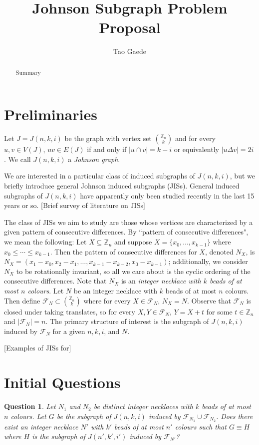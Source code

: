 \documentclass[12]{article}
\title{ \vspace{-3cm} Johnson Subgraph Problem Proposal }
\author{Tao Gaede}
\newcommand{\Z}{\mathbb{Z}}
\newtheorem{question}{Question}
\theoremstyle{definition}
\begin{document}
	\maketitle
	
	\begin{abstract}
		Summary
	\end{abstract}

	\section{Preliminaries}
	Let $J = J(n,k,i)$ be the graph with vertex set ${\Z_n \choose k}$ and for every $u,v \in V(J)$, $uv \in E(J)$ if and only if $|u \cap v| = k-i$ or equivalently $|u \Delta v| = 2i$.  We call $J(n,k,i)$ a \emph{Johnson graph}.
	
	We are interested in a particular class of induced subgraphs of $J(n,k,i)$, but we briefly introduce general Johnson induced subgraphs (JISs).  General induced subgraphs of $J(n,k,i)$ have apparently only been studied recently in the last 15 years or so. [Brief survey of literature on JISs]
	
	The class of JISs we aim to study are those whose vertices are characterized by a given pattern of consecutive differences.  By ``pattern of consecutive differences", we mean the following: Let $X \subseteq \Z_n$ and suppose $X = \{x_0,\ldots,x_{k-1}\}$ where $x_0 \leq \cdots \leq x_{k-1}$.  Then the pattern of consecutive differences for $X$, denoted $N_X$, is $N_X = (x_1-x_0,x_2-x_1,\ldots,x_{k-1} - x_{k-2}, x_0 - x_{k-1})$; additionally, we consider $N_X$ to be rotationally invariant, so all we care about is the cyclic ordering of the consecutive differences.  Note that $N_X$ is an \emph{integer necklace with $k$ beads of at most $n$ colours}.    Let $N$ be an integer necklace with $k$ beads of at most $n$ colours.  Then define $\mathcal{F}_N \subset {\Z_n \choose k}$ where for every $X \in \mathcal{F}_N$, $N_X = N$.  Observe that $\mathcal{F}_N$ is closed under taking translates, so for every $X,Y \in \mathcal{F}_N$, $Y = X + t$ for some $t \in \Z_n$ and $|\mathcal{F}_N| = n$.  The primary structure of interest is the subgraph of $J(n,k,i)$ induced by $\mathcal{F}_N$ for a given $n,k,i$, and $N$.
	
	[Examples of JISs for]
	
	\section{Initial Questions}
	
	\begin{question}
		Let $N_1$ and $N_2$ be distinct integer necklaces with $k$ beads of at most $n$ colours.  Let $G$ be the subgraph of $J(n,k,i)$ induced by $\mathcal{F}_{N_1} \cup \mathcal{F}_{N_2}$.  Does there exist an integer necklace $N'$ with $k'$ beads of at most $n'$ colours such that $G \equiv H$ where $H$ is the subgraph of $J(n',k',i')$ induced by $\mathcal{F}_{N'}$?
	\end{question}
	
	
	
	
\end{document}
